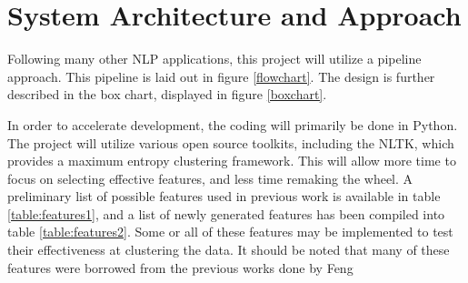 \documentclass[]{article}
\begin{document}
\section{System Architecture and Approach}

Following many other NLP applications, this project will utilize a pipeline approach.
This pipeline is laid out in figure \ref{flowchart}.
The design is further described in the box chart, displayed in figure \ref{boxchart}.

In order to accelerate development, the coding will primarily be done in Python.
The project will utilize various open source toolkits, including the NLTK, which provides a maximum entropy clustering framework.
This will allow more time to focus on selecting effective features, and less time remaking the wheel.
A preliminary list of possible features used in previous work is available in table \ref{table:features1}, and a list of newly generated features has been compiled into table \ref{table:features2}.
Some or all of these features may be implemented to test their effectiveness at clustering the data.
It should be noted that many of these features were borrowed from the previous works done by Feng \cite{feng2009cognitively}
\end{document}
